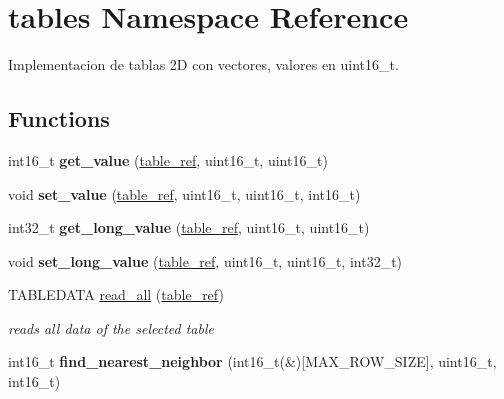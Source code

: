 \hypertarget{namespacetables}{}\section{tables Namespace Reference}
\label{namespacetables}


Implementacion de tablas 2D con vectores, valores en uint16\+\_\+t.  


\subsection*{Functions}
\begin{DoxyCompactItemize}
\item 
\mbox{\label{namespacetables_ad6abd6279ebdfd1813de8dee11e8d06c}} 
int16\+\_\+t {\bfseries get\+\_\+value} (\hyperlink{structtable__ref}{table\+\_\+ref}, uint16\+\_\+t, uint16\+\_\+t)
\item 
\mbox{\label{namespacetables_afdeac8e88a25e9a65a4afd6a6f881f20}} 
void {\bfseries set\+\_\+value} (\hyperlink{structtable__ref}{table\+\_\+ref}, uint16\+\_\+t, uint16\+\_\+t, int16\+\_\+t)
\item 
\mbox{\label{namespacetables_a8bb312dd55d1189bd4ceb6847087f9f5}} 
int32\+\_\+t {\bfseries get\+\_\+long\+\_\+value} (\hyperlink{structtable__ref}{table\+\_\+ref}, uint16\+\_\+t, uint16\+\_\+t)
\item 
\mbox{\label{namespacetables_a55cb401646e4582c598f0ed53f4bcfd7}} 
void {\bfseries set\+\_\+long\+\_\+value} (\hyperlink{structtable__ref}{table\+\_\+ref}, uint16\+\_\+t, uint16\+\_\+t, int32\+\_\+t)
\item 
T\+A\+B\+L\+E\+D\+A\+TA \hyperlink{namespacetables_a8a1bab94b65aabe4f2b226cdac58b41f}{read\+\_\+all} (\hyperlink{structtable__ref}{table\+\_\+ref})
\begin{DoxyCompactList}\small\item\em reads all data of the selected table \end{DoxyCompactList}\item 
\mbox{\label{namespacetables_a43fad35b2a42224031f3dc66799e7cc6}} 
int16\+\_\+t {\bfseries find\+\_\+nearest\+\_\+neighbor} (int16\+\_\+t(\&)\mbox{[}M\+A\+X\+\_\+\+R\+O\+W\+\_\+\+S\+I\+ZE\mbox{]}, uint16\+\_\+t, int16\+\_\+t)
\end{DoxyCompactItemize}



